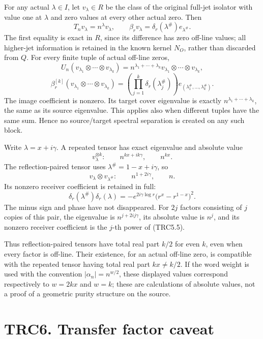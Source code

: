 For any actual \(\lambda\in I\), let \(v_\lambda\in R\) be the class of
the original full-jet isolator with value one at \(\lambda\) and zero
values at every other actual zero. Then \[
T_nv_\lambda=n^\lambda v_\lambda,\qquad
\beta_rv_\lambda=\delta_r(\lambda^\#)e_{\lambda^\#}.
\tag{TRC5.1}
\] The first equality is exact in \(R\), since its difference has zero
off-line values; all higher-jet information is retained in the known
kernel \(N_O\), rather than discarded from \(Q\). For every finite tuple
of actual off-line zeros, \[
U_n(v_{\lambda_1}\otimes\cdots\otimes v_{\lambda_k})
=n^{\lambda_1+\cdots+\lambda_k}
v_{\lambda_1}\otimes\cdots\otimes v_{\lambda_k},
\] \[
\beta_r^{[k]}(v_{\lambda_1}\otimes\cdots\otimes v_{\lambda_k})
=\left(\prod_{j=1}^k\delta_r(\lambda_j^\#)\right)
e_{(\lambda_1^\#,\ldots,\lambda_k^\#)}.
\tag{TRC5.2}
\] The image coefficient is nonzero. Its target cover eigenvalue is
exactly \(n^{\lambda_1+\cdots+\lambda_k}\), the same as its source
eigenvalue. This applies also when different tuples have the same sum.
Hence no source/target spectral separation is created on any such block.

Write \(\lambda=x+i\gamma\). A repeated tensor has exact eigenvalue and
absolute value \[
v_\lambda^{\otimes k}:\qquad n^{kx+ik\gamma},\qquad n^{kx}.
\tag{TRC5.3}
\] The reflection-paired tensor uses \(\lambda^\#=1-x+i\gamma\), so \[
v_\lambda\otimes v_{\lambda^\#}:\qquad
n^{1+2i\gamma},\qquad n.
\tag{TRC5.4}
\] Its nonzero receiver coefficient is retained in full: \[
\delta_r(\lambda^\#)\delta_r(\lambda)
=-e^{2i\gamma\log r}\bigl(r^x-r^{1-x}\bigr)^2.
\tag{TRC5.5}
\] The minus sign and phase have not disappeared. For \(2j\) factors
consisting of \(j\) copies of this pair, the eigenvalue is
\(n^{j+2ij\gamma}\), its absolute value is \(n^j\), and its nonzero
receiver coefficient is the \(j\)-th power of (TRC5.5).

Thus reflection-paired tensors have total real part \(k/2\) for even
\(k\), even when every factor is off-line. Their existence, for an
actual off-line zero, is compatible with the repeated tensor having
total real part \(kx\ne k/2\). If the word weight is used with the
convention \(|\alpha_n|=n^{w/2}\), these displayed values correspond
respectively to \(w=2kx\) and \(w=k\); these are calculations of
absolute values, not a proof of a geometric purity structure on the
source.

\section{TRC6. Transfer factor
caveat}\label{trc6.-transfer-factor-caveat}

